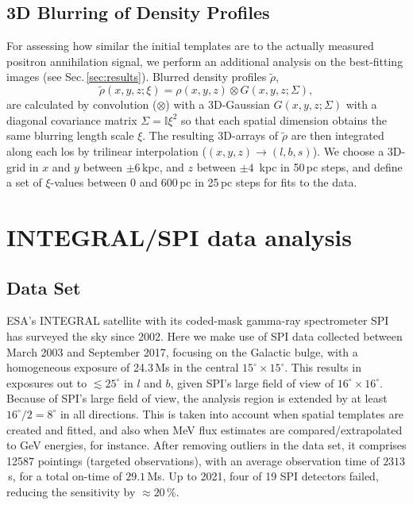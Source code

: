 \documentclass[doublespace,nopageskip]{VTthesis} %
\begin{document}
\subsection{3D Blurring of Density Profiles}\label{sec:blurring_maps}
%
For assessing how similar the initial templates are to the actually measured positron annihilation signal, we perform an additional analysis on the best-fitting images (see Sec.\,\ref{sec:results}).
%
Blurred density profiles $\tilde{\rho}$,
%
\begin{equation}
	\tilde{\rho}(x,y,z;\xi) = \rho(x,y,z) \otimes G(x,y,z;\Sigma)\mathrm{,} 
	\label{eq:3Dblurring}
\end{equation}
%
\noindent are calculated by convolution ($\otimes$) with a 3D-Gaussian  $G(x,y,z;\Sigma)$ with a diagonal covariance matrix $\Sigma = \mathbb{I}\xi^2$ so that each spatial dimension obtains the same blurring length scale $\xi$.
%
The resulting 3D-arrays of $\tilde{\rho}$ are then integrated along each los by trilinear interpolation ($(x,y,z) \rightarrow (l,b,s)$).
%
We choose a 3D-grid in $x$ and $y$ between $\pm 6$\,kpc, and $z$ between $\pm 4$\, kpc in 50\,pc steps, and define a set of $\xi$-values between 0 and 600\,pc in 25\,pc steps for fits to the data.




\section{INTEGRAL/SPI data analysis}\label{sec:data_analysis}
%
\subsection{Data Set}\label{sec:data_set}
%
ESA's INTEGRAL satellite \citep{Winkler2003_INTEGRAL} with its coded-mask gamma-ray spectrometer SPI \citep{Vedrenne2003_SPI} has surveyed the sky since 2002. 
%
Here we make use of SPI data collected between March 2003 and September 2017, focusing on the Galactic bulge, with a homogeneous exposure of 24.3\,Ms in the central $15^{\circ} \times 15^{\circ}$.
%
This results in exposures out to $\lesssim 25^{\circ}$ in $l$ and $b$, given SPI's large field of view of $16^{\circ} \times 16^{\circ}$. 
%
Because of SPI's large field of view, the analysis region is extended by at least $16^{\circ}/2 = 8^{\circ}$ in all directions.
%
This is taken into account when spatial templates are created and fitted, and also when MeV flux estimates are compared/extrapolated to GeV energies, for instance.
%
After removing outliers in the data set, it comprises 12587 pointings (targeted observations), with an average observation time of $2313$\,s, for a total on-time of $29.1$\,Ms.
%
Up to 2021, four of 19 SPI detectors failed, reducing the sensitivity by $\approx 20\,\%$.
\end{document}
